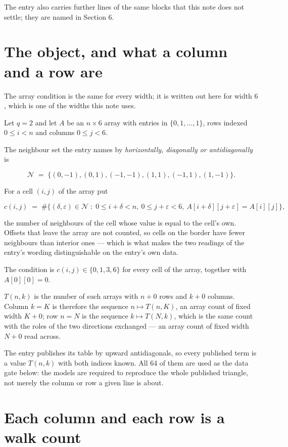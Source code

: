 \documentclass[11pt]{article}
\theoremstyle{definition}
\begin{document}
The entry also carries further lines of the same blocks that this note does not settle; they are named in Section 6.

\section{The object, and what a column and a row are}

The array condition is the same for every width; it is written out here for width $6$, which is one of the widths this note uses.

Let $q = 2$ and let $A$ be an $n \times 6$ array with entries in $\{0,1,\dots,1\}$, rows indexed $0 \le i < n$ and columns $0 \le j < 6$.

The neighbour set the entry names by {\itshape horizontally, diagonally or antidiagonally} is

\[\mathcal{N} \;=\; \{(0,-1), (0,1), (-1,-1), (1,1), (-1,1), (1,-1)\}.\]

For a cell $(i,j)$ of the array put

\[c(i,j) \;=\; \#\bigl\{(\delta,\varepsilon)\in\mathcal{N} \;:\; 0\le i+\delta<n,\ 0\le j+\varepsilon<6,\ A[i+\delta][j+\varepsilon] = A[i][j]\bigr\},\]

the number of neighbours of the cell whose value is equal to the cell's own. Offsets that leave the array are not counted, so cells on the border have fewer neighbours than interior ones --- which is what makes the two readings of the entry's wording distinguishable on the entry's own data.

The condition is $c(i,j) \in \{0, 1, 3, 6\}$ for every cell of the array, together with $A[0][0]=0$.

$T(n,k)$ is the number of such arrays with $n + 0$ rows and $k + 0$ columns. Column $k = K$ is therefore the sequence $n \mapsto T(n,K)$, an array count of fixed width $K + 0$; row $n = N$ is the sequence $k \mapsto T(N,k)$, which is the same count with the roles of the two directions exchanged --- an array count of fixed width $N + 0$ read across.

The entry publishes its table by upward antidiagonals, so every published term is a value $T(n,k)$ with both indices known. All 64 of them are used as the data gate below: the models are required to reproduce the whole published triangle, not merely the column or row a given line is about.

\section{Each column and each row is a walk count}
\end{document}

